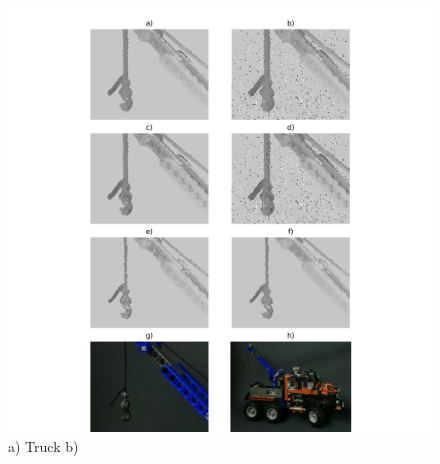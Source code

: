 \documentclass  [
  paper    = a4,
  BCOR     = 10mm,
  twoside,
  fontsize = 12pt,
  fleqn,
  toc      = bibnumbered,
  toc      = listofnumbered,
  numbers  = noendperiod,
  headings = normal,
  listof   = leveldown,
  version  = 3.03
]                                       {scrreprt}
\begin{document}
\begin{figure}
	\centering
	\includegraphics[width=1\linewidth]{images/truck_realdata_small}
	\caption[Truck with iterative SGM]{a) Truck b)}
	\label{fig:truckrealdatasmall}
\end{figure}
\end{document}

